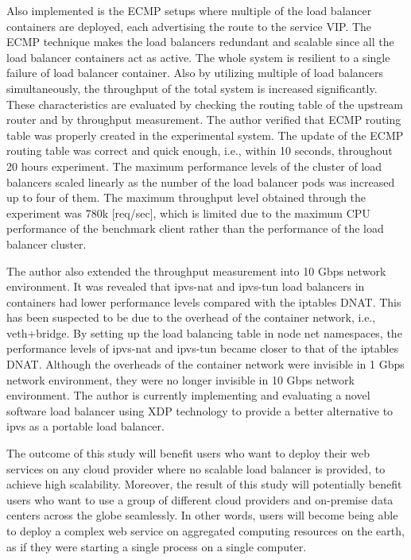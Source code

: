Also implemented is the ECMP setups where multiple of the load balancer containers are deployed, each advertising the route to the service VIP.
The ECMP technique makes the load balancers redundant and scalable since all the load balancer containers act as active.
The whole system is resilient to a single failure of load balancer container.
Also by utilizing multiple of load balancers simultaneously, the throughput of the total system is increased significantly.
These characteristics are evaluated by checking the routing table of the upstream router and by throughput measurement.
%
The author verified that ECMP routing table was properly created in the experimental system.
The update of the ECMP routing table was correct and quick enough, i.e., within 10 seconds, throughout 20 hours experiment.
The maximum performance levels of the cluster of load balancers scaled linearly as the number of the load balancer pods was increased up to four of them.
The maximum throughput level obtained through the experiment was 780k [req/sec], which is limited due to the maximum CPU performance of the benchmark client rather than the performance of the load balancer cluster.

The author also extended the throughput measurement into 10 Gbps network environment.
It was revealed that ipvs-nat and ipvs-tun load balancers in containers had lower performance levels compared with the iptables DNAT.
This has been suspected to be due to the overhead of the container network, i.e., veth+bridge.
By setting up the load balancing table in node net namespaces, the performance levels of ipvs-nat and ipvs-tun became closer to that of the iptables DNAT.
Although the overheads of the container network were invisible in 1 Gbps network environment, they were no longer invisible in 10 Gbps network environment.
The author is currently implementing and evaluating a novel software load balancer using XDP technology to provide a better alternative to ipvs as a portable load balancer.

The outcome of this study will benefit users who want to deploy their web services on any cloud provider where no scalable load balancer is provided, to achieve high scalability.
Moreover, the result of this study will potentially benefit users who want to use a group of different cloud providers and on-premise data centers across the globe seamlessly.
In other words, users will become being able to deploy a complex web service on aggregated computing resources on the earth, as if they were starting a single process on a single computer.


